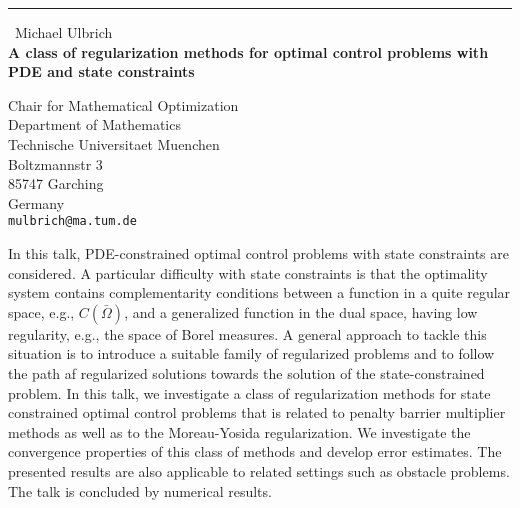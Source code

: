\documentclass{report}
\begin{document}
\begin{center}
\rule{6in}{1pt} \
{\large Michael Ulbrich \\
{\bf A class of regularization methods for optimal control problems with PDE and state constraints }}

Chair for Mathematical Optimization \\ Department of Mathematics \\ Technische Universitaet Muenchen \\ Boltzmannstr 3 \\ 85747 Garching \\ Germany
\\
{\tt mulbrich@ma.tum.de}\end{center}

In this talk, PDE-constrained optimal control problems with state
constraints are considered. A particular difficulty with state
constraints is that the optimality system contains complementarity
conditions between a function in a quite regular space, e.g.,
$C(\bar\Omega)$, and a generalized function in the dual space, having low
regularity, e.g., the space of Borel measures.
A general approach to tackle this situation is to introduce a suitable
family of regularized problems and to follow the path af regularized
solutions towards the solution of the state-constrained problem.
In this talk, we investigate a class of regularization methods for state
constrained optimal control problems that is related to penalty barrier
multiplier methods as well as to the Moreau-Yosida regularization.
We investigate the convergence properties of this class of methods and
develop error estimates. The presented results are also applicable to
related settings such as obstacle problems. The talk is concluded by
numerical results.
\end{document}
